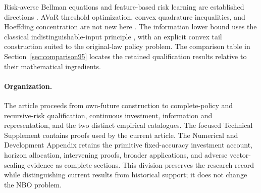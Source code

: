 Risk-averse Bellman equations and feature-based risk learning are established directions \citep{ruszczynski2010risk,ruszczynski2014erratum,ruszczynskiyang2025}. AVaR threshold optimization, convex quadrature inequalities, and Hoeffding concentration are not new here \citep{RockafellarUryasev2000,alomari2016hermite,hoeffding1963}. The information lower bound uses the classical indistinguishable-input principle \citep{Novak2015Integration97}, with an explicit convex tail construction suited to the original-law policy problem. The comparison table in Section~\ref{sec:comparison95} locates the retained qualification results relative to their mathematical ingredients.

\paragraph{Organization.}
The article proceeds from own-future construction to complete-policy and recursive-risk qualification, continuous investment, information and representation, and the two distinct empirical catalogues. The focused Technical Supplement contains proofs used by the current article. The Numerical and Development Appendix retains the primitive fixed-accuracy investment account, horizon allocation, intervening proofs, broader applications, and adverse vector-scaling evidence as complete sections. This division preserves the research record while distinguishing current results from historical support; it does not change the NBO problem.
